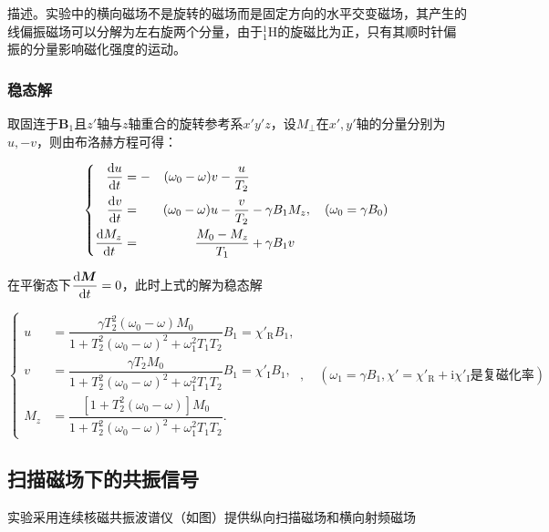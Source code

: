 描述。实验中的横向磁场不是旋转的磁场而是固定方向的水平交变磁场，其产生的线偏振磁场可以分解为左右旋两个分量，由于\(^1_1\mathrm{H}\)的旋磁比为正，只有其顺时针偏振的分量影响磁化强度的运动。

\subsubsection{稳态解}\label{ux7a33ux6001ux89e3}

取固连于\(\boldsymbol{B}_1\)且\(z'\)轴与\(z\)轴重合的旋转参考系\(x'y'z\)，设\(M_{\perp}\)在\(x',y'\)轴的分量分别为\(u,-v\)，则由布洛赫方程可得：

\begin{equation}
  \left\{
  \begin{aligned}
    \dfrac{{\rm d}u}{{\rm d}t} & = - & (\omega_0 - \omega)v-\dfrac{u}{T_2} &\\
    \dfrac{{\rm d}v}{{\rm d}t} & = & (\omega_0 - \omega)u-\dfrac{v}{T_2} & - \gamma B_1M_z\\
    \dfrac{{\rm d}M_z}{{\rm d}t} & = & \dfrac{M_0-M_z}{T_1} & + \gamma B_1 v
  \end{aligned}
  ,\quad (\omega_0 = \gamma B_0)\right.
\end{equation}

在平衡态下\(\dfrac{{\rm d}\boldsymbol{M}}{{\rm d}t}=0\)，此时上式的解为稳态解

\begin{equation}
  \left\{
  \begin{aligned}
      u & = \dfrac{\gamma T_2^2(\omega_0-\omega)M_0}{1+T_2^2(\omega_0-\omega)^2+\omega_1^2T_1T_2}B_1 = \chi'_{\mathrm{R}} B_1,\\
      v & = \dfrac{\gamma T_2M_0}{1+T_2^2(\omega_0-\omega)^2+\omega_1^2T_1T_2}B_1 = \chi'_{\mathrm{I}} B_1,\\
      M_z & = \dfrac{[1+T_2^2(\omega_0-\omega)]M_0}{1+T_2^2(\omega_0-\omega)^2+\omega_1^2T_1T_2}.
  \end{aligned}
  ,\quad (\omega_1 = \gamma B_1, \chi' = \chi'_{\mathrm{R}}+\mathrm{i}\chi'_{\mathrm{I}}\text{是复磁化率})\right.
\end{equation}

\subsection{扫描磁场下的共振信号}\label{ux8109ux51b2ux26c1ux573aux4e0bux7684ux5171ux632fux4fe1ux53f6}

实验采用连续核磁共振波谱仪（如图）提供纵向扫描磁场和横向射频磁场

